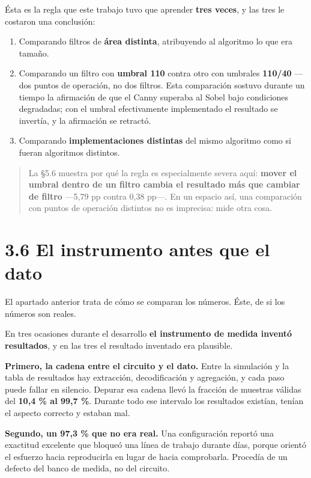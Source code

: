 Ésta es la regla que este trabajo tuvo que aprender \textbf{tres veces},
y las tres le costaron una conclusión:

\begin{enumerate}
\def\labelenumi{\arabic{enumi}.}
\tightlist
\item
  Comparando filtros de \textbf{área distinta}, atribuyendo al algoritmo
  lo que era tamaño.
\item
  Comparando un filtro con \textbf{umbral 110} contra otro con umbrales
  \textbf{110/40} --- dos puntos de operación, no dos filtros. Esta
  comparación sostuvo durante un tiempo la afirmación de que el Canny
  superaba al Sobel bajo condiciones degradadas; con el umbral
  efectivamente implementado el resultado se invertía, y la afirmación
  se retractó.
\item
  Comparando \textbf{implementaciones distintas} del mismo algoritmo
  como si fueran algoritmos distintos.
\end{enumerate}

\begin{quote}
La §5.6 muestra por qué la regla es especialmente severa aquí:
\textbf{mover el umbral dentro de un filtro cambia el resultado más que
cambiar de filtro} ---5,79 pp contra 0,38 pp---. En un espacio así, una
comparación con puntos de operación distintos no es imprecisa: mide otra
cosa.
\end{quote}

\section{3.6 El instrumento antes que el
dato}\label{el-instrumento-antes-que-el-dato}

El apartado anterior trata de cómo se comparan los números. Éste, de si
los números son reales.

En tres ocasiones durante el desarrollo \textbf{el instrumento de medida
inventó resultados}, y en las tres el resultado inventado era plausible.

\textbf{Primero, la cadena entre el circuito y el dato.} Entre la
simulación y la tabla de resultados hay extracción, decodificación y
agregación, y cada paso puede fallar en silencio. Depurar esa cadena
llevó la fracción de muestras válidas del \textbf{10,4 \% al 99,7 \%}.
Durante todo ese intervalo los resultados existían, tenían el aspecto
correcto y estaban mal.

\textbf{Segundo, un 97,3 \% que no era real.} Una configuración reportó
una exactitud excelente que bloqueó una línea de trabajo durante días,
porque orientó el esfuerzo hacia reproducirla en lugar de hacia
comprobarla. Procedía de un defecto del banco de medida, no del
circuito.

